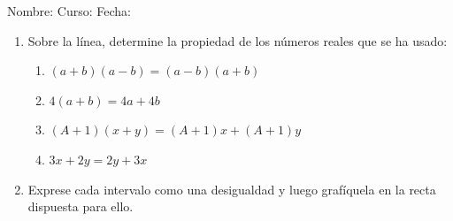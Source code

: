 \documentclass[fleqn]{article}
\newcommand{\LineaNombre}{%
\par
\vspace{\baselineskip}
Nombre:\hrulefill \; Curso: \underline{\hspace*{48pt}} \; Fecha: \underline{\hspace*{2.5cm}} \relax
\par}
\begin{document}
\LineaNombre
\begin{enumerate}
   \item Sobre la línea, determine la propiedad de los números reales que se ha usado:
  \begin{enumerate}
    \item $ (a+b)(a-b)=(a-b)(a+b) $ \underline{\hspace{6cm}}
    \item $ 4(a+b)=4a+4b $ \underline{\hspace{6cm}}
    \item $ (A+1)(x+y)=(A+1)x+(A+1)y $ \underline{\hspace{6cm}}
    \item $ 3x+2y=2y+3x $ \underline{\hspace{6cm}}
  \end{enumerate}
  \item Exprese cada intervalo como una desigualdad y luego grafíquela en la recta dispuesta para ello.
  

\end{enumerate}
\end{document}
